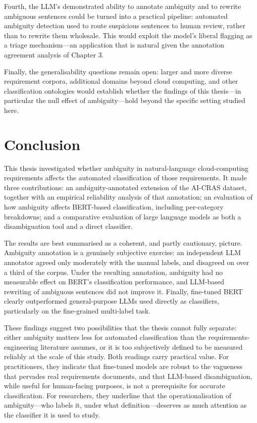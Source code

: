 Fourth, the LLM's demonstrated ability to annotate ambiguity and to rewrite ambiguous sentences could be turned into a practical pipeline: automated ambiguity detection used to route suspicious sentences to human review, rather than to rewrite them wholesale. This would exploit the model's liberal flagging as a triage mechanism---an application that is natural given the annotation agreement analysis of Chapter 3.

Finally, the generalisability questions remain open: larger and more diverse requirement corpora, additional domains beyond cloud computing, and other classification ontologies would establish whether the findings of this thesis---in particular the null effect of ambiguity---hold beyond the specific setting studied here.

\section{Conclusion}

This thesis investigated whether ambiguity in natural-language cloud-computing requirements affects the automated classification of those requirements. It made three contributions: an ambiguity-annotated extension of the AI-CRAS dataset, together with an empirical reliability analysis of that annotation; an evaluation of how ambiguity affects BERT-based classification, including per-category breakdowns; and a comparative evaluation of large language models as both a disambiguation tool and a direct classifier.

The results are best summarised as a coherent, and partly cautionary, picture. Ambiguity annotation is a genuinely subjective exercise: an independent LLM annotator agreed only moderately with the manual labels, and disagreed on over a third of the corpus. Under the resulting annotation, ambiguity had no measurable effect on BERT's classification performance, and LLM-based rewriting of ambiguous sentences did not improve it. Finally, fine-tuned BERT clearly outperformed general-purpose LLMs used directly as classifiers, particularly on the fine-grained multi-label task.

These findings suggest two possibilities that the thesis cannot fully separate: either ambiguity matters less for automated classification than the requirements-engineering literature assumes, or it is too subjectively defined to be measured reliably at the scale of this study. Both readings carry practical value. For practitioners, they indicate that fine-tuned models are robust to the vagueness that pervades real requirements documents, and that LLM-based disambiguation, while useful for human-facing purposes, is not a prerequisite for accurate classification. For researchers, they underline that the operationalisation of ambiguity---who labels it, under what definition---deserves as much attention as the classifier it is used to study.
